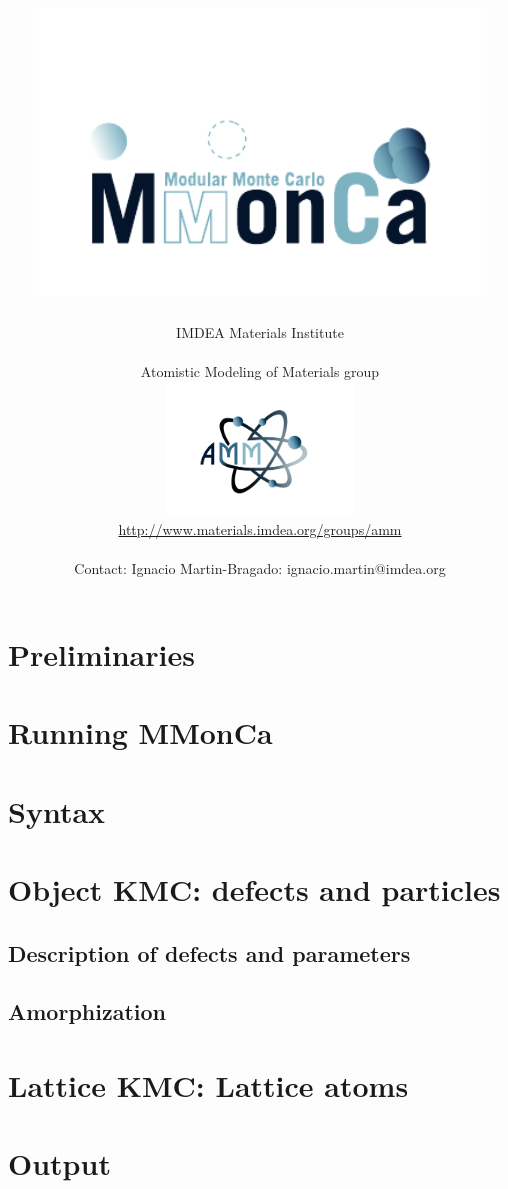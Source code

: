 \documentclass[a4paper]{book}
\author{{\Huge IMDEA Materials Institute}\\
\\
{\huge Atomistic Modeling of Materials group}\\
\includegraphics[width=5cm]{images/AMM}\\
\url{http://www.materials.imdea.org/groups/amm}\\
\\
Contact: Ignacio\protect\index{Ignacio} Martin-Bragado: ignacio.martin@imdea.org}
\title{\includegraphics[width=12cm]{images/logo}}
\begin{document}
\maketitle
\tableofcontents


\newpage
\chapter{Preliminaries}





\chapter{Running MMonCa}




\chapter{Syntax}


\chapter{Object KMC: defects and particles}



\section{Description of defects and parameters}





\section{Amorphization}


\chapter{Lattice KMC: Lattice atoms}


\chapter{Output}



\end{document}
